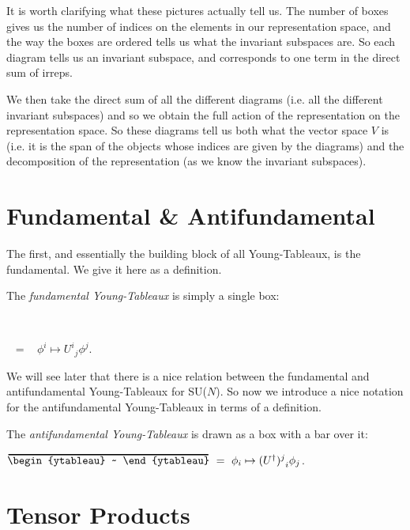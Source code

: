 It is worth clarifying what these pictures actually tell us. The number of boxes gives us the number of indices on the elements in our representation space, and the way the boxes are ordered tells us what the invariant subspaces are. So each diagram tells us an invariant subspace, and corresponds to one term in the direct sum of irreps. 

We then take the direct sum of all the different diagrams (i.e. all the different invariant subspaces) and so we obtain the full action of the representation on the representation space. So these diagrams tell us both what the vector space $V$ is (i.e. it is the span of the objects whose indices are given by the diagrams) and the decomposition of the representation (as we know the invariant subspaces).

\section{Fundamental \& Antifundamental}

The first, and essentially the building block of all Young-Tableaux, is the fundamental. We give it here as a definition.

    The \textit{fundamental Young-Tableaux} is simply a single box:
    \begin{center}
        \begin{ytableau}
            ~ 
        \end{ytableau} ~ = ~ $\phi^i \mapsto {U^i}_j \phi^j$.
    \end{center}
\ed

We will see later that there is a nice relation between the fundamental and antifundamental Young-Tableaux for SU($N$). So now we introduce a nice notation for the antifundamental Young-Tableaux in terms of a definition.

    The \textit{antifundamental Young-Tableaux} is drawn as a box with a bar over it:
    \begin{center}
        $\myov{\begin{ytableau}
            ~ 
        \end{ytableau}} ~ = ~ \phi_i \mapsto {(U^{\dagger})^j}_i \phi_j$.
    \end{center}
\ed

\section{Tensor Products}

